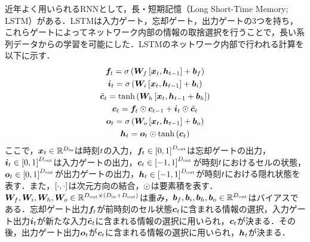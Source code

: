 \documentclass[12pt]{jarticle}
\numberwithin{equation}{section}    %
\numberwithin{figure}{section}      %
\numberwithin{table}{section}      %
\begin{document}
近年よく用いられるRNNとして，長・短期記憶（Long Short-Time Memory; LSTM）\cite{hochreiter1997long}がある．LSTMは入力ゲート，忘却ゲート，出力ゲートの3つを持ち，これらゲートによってネットワーク内部の情報の取捨選択を行うことで，長い系列データからの学習を可能にした．LSTMのネットワーク内部で行われる計算を以下に示す．
\begin{gather}
    \bm{f}_{t} = \sigma\left(\bm{W}_{f}\left[\bm{x}_{t}, \bm{h}_{t-1}\right] + \bm{b}_{f}\right) \\
    \bm{i}_{t} = \sigma\left(\bm{W}_{i}\left[\bm{x}_{t}, \bm{h}_{t-1}\right] + \bm{b}_{i}\right) \\
    \tilde{\bm{c}}_{t} = \tanh\left(\bm{W}_{h}\left[\bm{x}_{t}, \bm{h}_{t-1} + \bm{b}_{h}\right]\right) \\
    \bm{c}_{t} = \bm{f}_{t} \odot \bm{c}_{t-1} + \bm{i}_{t} \odot \tilde{\bm{c}}_{t} \\
    \bm{o}_{t} = \sigma\left(\bm{W}_{o}\left[\bm{x}_{t}, \bm{h}_{t-1}\right] + \bm{b}_{o}\right) \\
    \bm{h}_{t} = \bm{o}_{t} \odot \tanh\left(\bm{c}_{t}\right)
\end{gather}
ここで，$\bm{x}_{t} \in \mathbb{R}^{D_{\text{in}}}$は時刻$t$の入力，$\bm{f}_{t} \in \left[0, 1\right]^{D_{\text{out}}}$は忘却ゲートの出力，$\bm{i}_{t} \in \left[0, 1\right]^{D_{\text{out}}}$は入力ゲートの出力，$\bm{c}_{t} \in \left[-1, 1\right]^{D_{\text{out}}}$が時刻$t$におけるセルの状態，$\bm{o}_{t} \in \left[0, 1\right]^{D_{\text{out}}}$が出力ゲートの出力，$\bm{h}_{t} \in \left[-1, 1\right]^{D_{\text{out}}}$が時刻$t$における隠れ状態を表す．また，$\left[\cdot, \cdot\right]$は次元方向の結合，$\odot$は要素積を表す．$\bm{W}_{f}, \bm{W}_{i}, \bm{W}_{h}, \bm{W}_{o} \in \mathbb{R}^{D_{\text{out}} \times \left(D_{\text{in}} + D_{\text{out}}\right)}$は重み，$\bm{b}_{f}, \bm{b}_{i}, \bm{b}_{h}, \bm{b}_{o} \in \mathbb{R}^{D_{\text{out}}}$はバイアスである．忘却ゲート出力$\bm{f}_{t}$が前時刻のセル状態$\bm{c}_{t}$に含まれる情報の選択，入力ゲート出力$\bm{i}_{t}$が新たな入力$\tilde{\bm{c}}_{t}$に含まれる情報の選択に用いられ，$\bm{c}_{t}$が決まる．その後，出力ゲート出力$\bm{o}_{t}$が$\bm{c}_{t}$に含まれる情報の選択に用いられ，$\bm{h}_{t}$が決まる．
\end{document}
